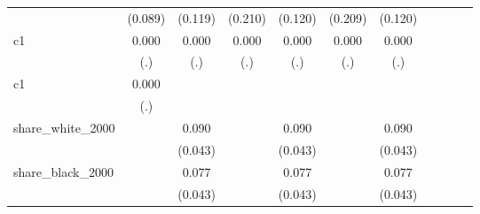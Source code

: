{\begin{tabular}{l*{10}{c}}
                    &     (0.089)         &     (0.119)         &     (0.210)         &     (0.120)         &     (0.209)         &     (0.120)         &                     &                     &                     &                     \\
\addlinespace
c1                  &       0.000         &       0.000         &       0.000         &       0.000         &       0.000         &       0.000         &                     &                     &                     &                     \\
                    &         (.)         &         (.)         &         (.)         &         (.)         &         (.)         &         (.)         &                     &                     &                     &                     \\
\addlinespace
c1                  &       0.000         &                     &                     &                     &                     &                     &                     &                     &                     &                     \\
                    &         (.)         &                     &                     &                     &                     &                     &                     &                     &                     &                     \\
\addlinespace
share\_white\_2000    &                     &       0.090\sym{**} &                     &       0.090\sym{**} &                     &       0.090\sym{**} &                     &                     &                     &                     \\
                    &                     &     (0.043)         &                     &     (0.043)         &                     &     (0.043)         &                     &                     &                     &                     \\
\addlinespace
share\_black\_2000    &                     &       0.077\sym{*}  &                     &       0.077\sym{*}  &                     &       0.077\sym{*}  &                     &                     &                     &                     \\
                    &                     &     (0.043)         &                     &     (0.043)         &                     &     (0.043)         &                     &                     &                     &                     \\

\end{tabular}}

